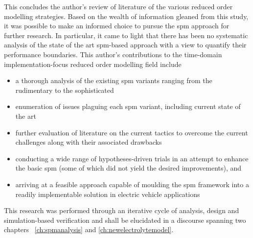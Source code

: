 This concludes  the author's review of  literature of the various  reduced order
modelling  strategies. Based  on the  wealth  of information  gleaned from  this
study,  it was  possible to  make  an informed  choice to  pursue the  \gls{spm}
approach  for further  research.  In particular,  it came  to  light that  there
has  been  no systematic  analysis  of  the  state  of the  art  \gls{spm}-based
approach with  a view  to quantify their  performance boundaries.  This author's
contributions to  the time-domain  implementation-focus reduced  order modelling
field include
\begin{itemize}[noitemsep,topsep=0pt, before={\vspace*{-0.25\baselineskip}}]
    \item a thorough analysis of the existing \gls{spm} variants ranging from the rudimentary to the sophisticated
    \item enumeration of issues plaguing each \gls{spm} variant, including current state of the art
    \item further evaluation of literature on the current tactics to overcome the current challenges along with their associated drawbacks
    \item conducting a  wide range of hypotheses-driven trials in an attempt to enhance  the basic \gls{spm} (some of which did not yield the desired
        improvements), and
    \item arriving at  a  feasible  approach  capable  of  moulding  the
        \gls{spm}  framework into  a  readily implementable  solution in
        electric vehicle applications
\end{itemize}
This research was  performed through an iterative cycle of  analysis, design and
simulation-based verification  and shall be  elucidated in a  discourse spanning
two chapters \viz~\cref{ch:spmanalysis} and \cref{ch:newelectrolytemodel}.

